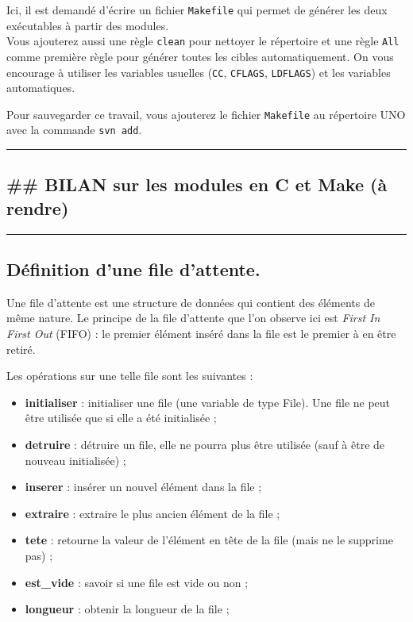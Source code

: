 \documentclass[11pt]{article}
\providecommand{\tightlist}{%
      \setlength{\itemsep}{0pt}\setlength{\parskip}{0pt}}
\begin{document}
Ici, il est demandé d'écrire un fichier \texttt{Makefile} qui permet de
générer les deux exécutables à partir des modules.\\
Vous ajouterez aussi une règle \texttt{clean} pour nettoyer le
répertoire et une règle \texttt{All} comme première règle pour générer
toutes les cibles automatiquement. On vous encourage à utiliser les
variables usuelles (\texttt{CC}, \texttt{CFLAGS}, \texttt{LDFLAGS}) et
les variables automatiques.

Pour sauvegarder ce travail, vous ajouterez le fichier \texttt{Makefile}
au répertoire UNO avec la commande \texttt{svn\ add}.

    \begin{center}\rule{0.5\linewidth}{\linethickness}\end{center}

    \subsection{\#\# BILAN sur les modules en C et Make (à
rendre)}\label{bilan-sur-les-modules-en-c-et-make-uxe0-rendre}

\begin{center}\rule{0.5\linewidth}{\linethickness}\end{center}

    \subsection{Définition d'une file
d'attente.}\label{duxe9finition-dune-file-dattente.}

Une file d'attente est une structure de données qui contient des
éléments de même nature. Le principe de la file d'attente que l'on
observe ici est \emph{First In First Out} (FIFO) : le premier élément
inséré dans la file est le premier à en être retiré.

Les opérations sur une telle file sont les suivantes :

\begin{itemize}
\tightlist
\item
  \textbf{initialiser} : initialiser une file (une variable de type
  File). Une file ne peut être utilisée que si elle a été initialisée ;
\item
  \textbf{detruire} : détruire un file, elle ne pourra plus être
  utilisée (sauf à être de nouveau initialisée) ;
\item
  \textbf{inserer} : insérer un nouvel élément dans la file ;
\item
  \textbf{extraire} : extraire le plus ancien élément de la file ;
\item
  \textbf{tete} : retourne la valeur de l'élément en tête de la file
  (mais ne le supprime pas) ;
\item
  \textbf{est\_vide} : savoir si une file est vide ou non ;
\item
  \textbf{longueur} : obtenir la longueur de la file ;
\end{itemize}
\end{document}
